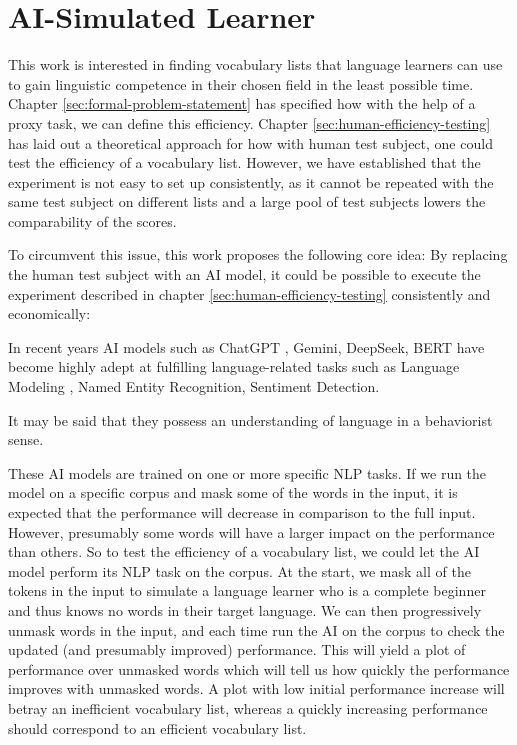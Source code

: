 \section{AI-Simulated Learner} \label{sec:ai-simulated-learner}

This work is interested in finding vocabulary lists that language learners can use to gain linguistic competence in their chosen field in the least possible time.
Chapter \ref{sec:formal-problem-statement} has specified how with the help of a proxy task, we can define this efficiency.
Chapter \ref{sec:human-efficiency-testing} has laid out a theoretical approach for how with human test subject, one could test the efficiency of a vocabulary list.
However, we have established that the experiment is not easy to set up consistently, as it cannot be repeated with the same test subject on different lists and a large pool of test subjects lowers the comparability of the scores.

To circumvent this issue, this work proposes the following core idea:
By replacing the human test subject with an AI model, it could be possible to execute the experiment described in chapter \ref{sec:human-efficiency-testing} consistently and economically:

In recent years AI models such as ChatGPT , Gemini, DeepSeek, BERT have become highly adept at fulfilling language-related tasks such as Language Modeling , Named Entity Recognition, Sentiment Detection.

It may be said that they possess an understanding of language in a behaviorist sense.

These AI models are trained on one or more specific NLP tasks.
If we run the model on a specific corpus and mask some of the words in the input, it is expected that the performance will decrease in comparison to the full input.
However, presumably some words will have a larger impact on the performance than others.
So to test the efficiency of a vocabulary list, we could let the AI model perform its NLP task on the corpus.
At the start, we mask all of the tokens in the input to simulate a language learner who is a complete beginner and thus knows no words in their target language.
We can then progressively unmask words in the input, and each time run the AI on the corpus to check the updated (and presumably improved) performance.
This will yield a plot of performance over unmasked words which will tell us how quickly the performance improves with unmasked words.
A plot with low initial performance increase will betray an inefficient vocabulary list, whereas a quickly increasing performance should correspond to an efficient vocabulary list.


